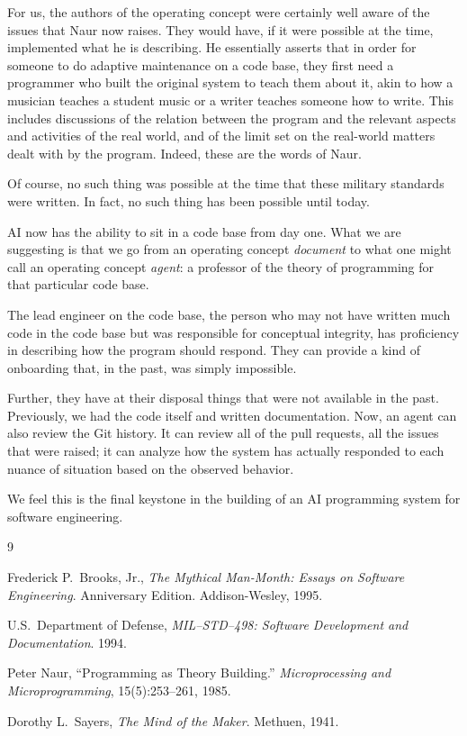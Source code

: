 \documentclass[12pt]{article}
\theoremstyle{plain}
\theoremstyle{definition}
\theoremstyle{remark}
\begin{document}
For us, the authors of the operating concept were certainly well aware
of the issues that Naur now raises. They would have, if it were
possible at the time, implemented what he is describing. He
essentially asserts that in order for someone to do adaptive
maintenance on a code base, they first need a programmer who built the
original system to teach them about it, akin to how a musician teaches
a student music or a writer teaches someone how to write. This
includes discussions of the relation between the program and the
relevant aspects and activities of the real world, and of the limit
set on the real-world matters dealt with by the program. Indeed, these
are the words of Naur.

Of course, no such thing was possible at the time that these military
standards were written. In fact, no such thing has been possible until
today.

AI now has the ability to sit in a code base from day one. What we are
suggesting is that we go from an operating concept \emph{document} to
what one might call an operating concept \emph{agent}: a professor of
the theory of programming for that particular code base.

The lead engineer on the code base, the person who may not have
written much code in the code base but was responsible for conceptual
integrity, has proficiency in describing how the program should
respond. They can provide a kind of onboarding that, in the past, was
simply impossible.

Further, they have at their disposal things that were not available in
the past. Previously, we had the code itself and written
documentation. Now, an agent can also review the Git history. It can
review all of the pull requests, all the issues that were raised; it
can analyze how the system has actually responded to each nuance of
situation based on the observed behavior.

We feel this is the final keystone in the building of an AI
programming system for software engineering.

\begin{thebibliography}{9}

Frederick P.\ Brooks, Jr., \emph{The Mythical Man-Month: Essays on
  Software Engineering}. Anniversary Edition. Addison-Wesley, 1995.

U.S.\ Department of Defense, \emph{MIL--STD--498: Software
  Development and Documentation}. 1994.

Peter Naur, ``Programming as Theory Building.''
\emph{Microprocessing and Microprogramming}, 15(5):253--261, 1985.

Dorothy L.\ Sayers, \emph{The Mind of the Maker}. Methuen, 1941.

\end{thebibliography}
\end{document}
